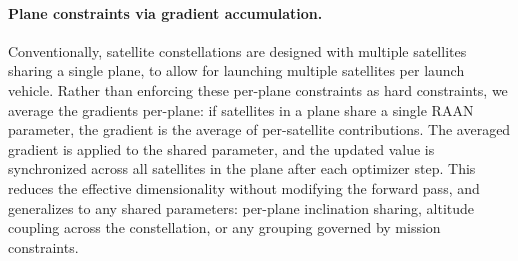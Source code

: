 
\paragraph{Plane constraints via gradient accumulation.}
Conventionally, satellite constellations are designed with multiple satellites sharing a single plane, to allow for launching multiple satellites per launch vehicle.
Rather than enforcing these per-plane constraints as hard constraints, we average the gradients per-plane: if satellites in a plane share a single RAAN parameter, the gradient is the average of per-satellite contributions.
The averaged gradient is applied to the shared parameter, and the updated value is synchronized across all satellites in the plane after each optimizer step.
This reduces the effective dimensionality without modifying the forward pass, and generalizes to any shared parameters: per-plane inclination sharing, altitude coupling across the constellation, or any grouping governed by mission constraints.

